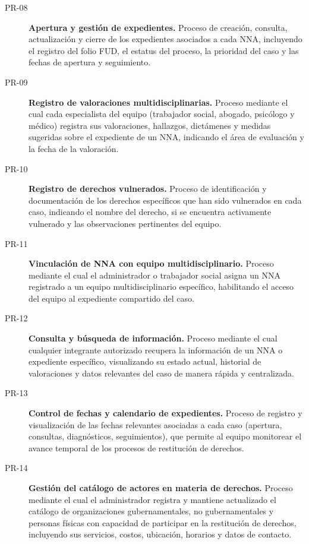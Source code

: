 \begin{description}
	\item[PR-08] \textbf{Apertura y gestión de expedientes.} Proceso de 
	creación, consulta, actualización y cierre de los expedientes asociados 
	a cada NNA, incluyendo el registro del folio FUD, el estatus del proceso, 
	la prioridad del caso y las fechas de apertura y seguimiento.
	
	\item[PR-09] \textbf{Registro de valoraciones multidisciplinarias.} 
	Proceso mediante el cual cada especialista del equipo (trabajador social, 
	abogado, psicólogo y médico) registra sus valoraciones, hallazgos, 
	dictámenes y medidas sugeridas sobre el expediente de un NNA, indicando 
	el área de evaluación y la fecha de la valoración.
	
	\item[PR-10] \textbf{Registro de derechos vulnerados.} Proceso de 
	identificación y documentación de los derechos específicos que han sido 
	vulnerados en cada caso, indicando el nombre del derecho, si se encuentra 
	activamente vulnerado y las observaciones pertinentes del equipo.
	
	\item[PR-11] \textbf{Vinculación de NNA con equipo multidisciplinario.} 
	Proceso mediante el cual el administrador o trabajador social asigna un 
	NNA registrado a un equipo multidisciplinario específico, habilitando el 
	acceso del equipo al expediente compartido del caso.
	
	\item[PR-12] \textbf{Consulta y búsqueda de información.} Proceso mediante 
	el cual cualquier integrante autorizado recupera la información de un NNA 
	o expediente específico, visualizando su estado actual, historial de 
	valoraciones y datos relevantes del caso de manera rápida y centralizada.
	
	\item[PR-13] \textbf{Control de fechas y calendario de expedientes.} 
	Proceso de registro y visualización de las fechas relevantes asociadas 
	a cada caso (apertura, consultas, diagnósticos, seguimientos), que permite 
	al equipo monitorear el avance temporal de los procesos de restitución 
	de derechos.
	
	\item[PR-14] \textbf{Gestión del catálogo de actores en materia de 
		derechos.} Proceso mediante el cual el administrador registra y mantiene 
	actualizado el catálogo de organizaciones gubernamentales, no 
	gubernamentales y personas físicas con capacidad de participar en la 
	restitución de derechos, incluyendo sus servicios, costos, ubicación, 
	horarios y datos de contacto.
	

\end{description}
